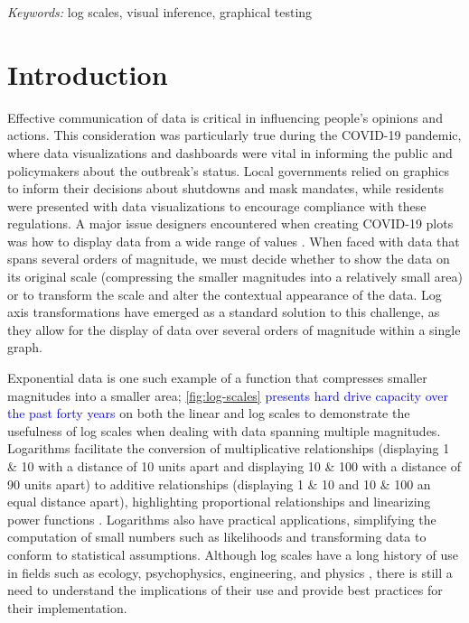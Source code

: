 \documentclass[12pt]{article}
\begin{document}
\noindent%
{\it Keywords:} log scales, visual inference, graphical testing
\vfill

\newpage
{} %

\hypertarget{introduction}{%
\section{Introduction}\label{introduction}}

Effective communication of data is critical in influencing people's
opinions and actions. This consideration was particularly true during
the COVID-19 pandemic, where data visualizations and dashboards were
vital in informing the public and policymakers about the outbreak's
status. Local governments relied on graphics to inform their decisions
about shutdowns and mask mandates, while residents were presented with
data visualizations to encourage compliance with these regulations. A
major issue {\textcolor{RedOrange}{designers}} encountered
{\textcolor{RedOrange}{when}} creating COVID-19 plots was how to display
data from a wide range of values
\citep{fagen-ulmschneider_2020, burnmurdoch_2020}. When faced with data
that spans several orders of magnitude, we must decide whether to show
the data on its original scale (compressing the smaller magnitudes into
a relatively small area) or to transform the scale and alter the
contextual appearance of the data. Log {\textcolor{RedOrange}{axis}}
transformations have emerged as a standard solution to this challenge,
as they allow for the display of data over several orders of magnitude
within a single graph.

Exponential {\textcolor{RedOrange}{data}} is one such example of a
function that compresses smaller magnitudes into a smaller area;
\cref{fig:log-scales}
{\textcolor{blue}{presents hard drive capacity over the past forty years}}
on both the linear and log scales to demonstrate the usefulness of log
scales when dealing with data spanning multiple magnitudes. Logarithms
facilitate the conversion of multiplicative relationships (displaying 1
\& 10 with a distance of 10 units apart and displaying 10 \& 100 with a
distance of 90 units apart) to additive relationships (displaying 1 \&
10 and 10 \& 100 an equal distance apart), highlighting proportional
relationships and linearizing power functions
\citep{menge_logarithmic_2018}. Logarithms also have practical
applications, simplifying the computation of small numbers such as
likelihoods and transforming data to conform to statistical assumptions.
Although log scales have a long history of use in fields such as
ecology, psychophysics, engineering, and physics
\citep{heckler_student_2013, waddell2005comparisons}, there is still a
need to understand the implications of their use and provide best
practices for their implementation.
\end{document}
